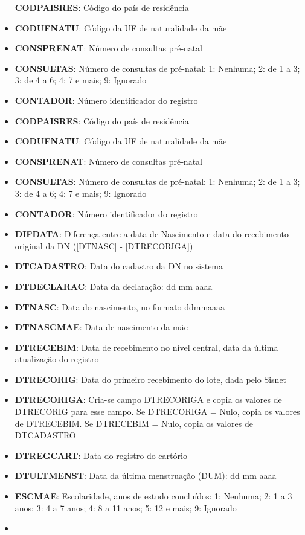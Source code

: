 \documentclass[
]{article}
\begin{document}
\begin{itemize}
  \textbf{CODPAISRES}: Código do país de residência
\item
  \textbf{CODUFNATU}: Código da UF de naturalidade da mãe
\item
  \textbf{CONSPRENAT}: Número de consultas pré‐natal
\item
  \textbf{CONSULTAS}: Número de consultas de pré-natal: 1: Nenhuma; 2:
  de 1 a 3; 3: de 4 a 6; 4: 7 e mais; 9: Ignorado
\item
  \textbf{CONTADOR}: Número identificador do registro
\item
  \textbf{CODPAISRES}: Código do país de residência
\item
  \textbf{CODUFNATU}: Código da UF de naturalidade da mãe
\item
  \textbf{CONSPRENAT}: Número de consultas pré‐natal
\item
  \textbf{CONSULTAS}: Número de consultas de pré-natal: 1: Nenhuma; 2:
  de 1 a 3; 3: de 4 a 6; 4: 7 e mais; 9: Ignorado
\item
  \textbf{CONTADOR}: Número identificador do registro
\item
  \textbf{DIFDATA}: Diferença entre a data de Nascimento e data do
  recebimento original da DN ({[}DTNASC{]} - {[}DTRECORIGA{]})
\item
  \textbf{DTCADASTRO}: Data do cadastro da DN no sistema
\item
  \textbf{DTDECLARAC}: Data da declaração: dd mm aaaa
\item
  \textbf{DTNASC}: Data do nascimento, no formato ddmmaaaa
\item
  \textbf{DTNASCMAE}: Data de nascimento da mãe
\item
  \textbf{DTRECEBIM}: Data de recebimento no nível central, data da
  última atualização do registro
\item
  \textbf{DTRECORIG}: Data do primeiro recebimento do lote, dada pelo
  Sisnet
\item
  \textbf{DTRECORIGA}: Cria-se campo DTRECORIGA e copia os valores de
  DTRECORIG para esse campo. Se DTRECORIGA = Nulo, copia os valores de
  DTRECEBIM. Se DTRECEBIM = Nulo, copia os valores de DTCADASTRO
\item
  \textbf{DTREGCART}: Data do registro do cartório
\item
  \textbf{DTULTMENST}: Data da última menstruação (DUM): dd mm aaaa
\item
  \textbf{ESCMAE}: Escolaridade, anos de estudo concluídos: 1: Nenhuma;
  2: 1 a 3 anos; 3: 4 a 7 anos; 4: 8 a 11 anos; 5: 12 e mais; 9:
  Ignorado
\item

\end{itemize}
\end{document}
